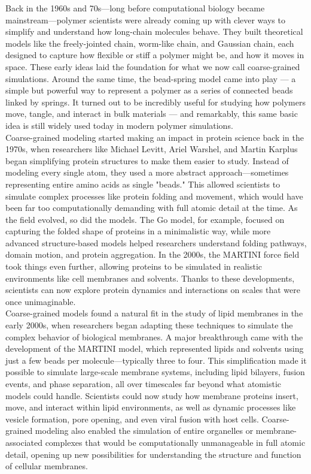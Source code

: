 \documentclass[12pt]{article}
\begin{document}
\begin{flushleft}
Back in the 1960s and 70s—long before computational biology became mainstream—polymer scientists were already coming up with clever ways to simplify and understand how long-chain molecules behave. They built theoretical models like the freely-jointed chain, worm-like chain, and Gaussian chain, each designed to capture how flexible or stiff a polymer might be, and how it moves in space. These early ideas laid the foundation for what we now call coarse-grained simulations. Around the same time, the bead-spring model came into play — a simple but powerful way to represent a polymer as a series of connected beads linked by springs. It turned out to be incredibly useful for studying how polymers move, tangle, and interact in bulk materials — and remarkably, this same basic idea is still widely used today in modern polymer simulations.\\

Coarse-grained modeling started making an impact in protein science back in the 1970s, when researchers like Michael Levitt, Ariel Warshel, and Martin Karplus began simplifying protein structures to make them easier to study. Instead of modeling every single atom, they used a more abstract approach—sometimes representing entire amino acids as single "beads." This allowed scientists to simulate complex processes like protein folding and movement, which would have been far too computationally demanding with full atomic detail at the time. As the field evolved, so did the models. The Go model, for example, focused on capturing the folded shape of proteins in a minimalistic way, while more advanced structure-based models helped researchers understand folding pathways, domain motion, and protein aggregation. In the 2000s, the MARTINI force field took things even further, allowing proteins to be simulated in realistic environments like cell membranes and solvents. Thanks to these developments, scientists can now explore protein dynamics and interactions on scales that were once unimaginable.\\

Coarse-grained models found a natural fit in the study of lipid membranes in the early 2000s, when researchers began adapting these techniques to simulate the complex behavior of biological membranes. A major breakthrough came with the development of the MARTINI model, which represented lipids and solvents using just a few beads per molecule—typically three to four. This simplification made it possible to simulate large-scale membrane systems, including lipid bilayers, fusion events, and phase separation, all over timescales far beyond what atomistic models could handle. Scientists could now study how membrane proteins insert, move, and interact within lipid environments, as well as dynamic processes like vesicle formation, pore opening, and even viral fusion with host cells. Coarse-grained modeling also enabled the simulation of entire organelles or membrane-associated complexes that would be computationally unmanageable in full atomic detail, opening up new possibilities for understanding the structure and function of cellular membranes.\\


\end{flushleft}
\end{document}
